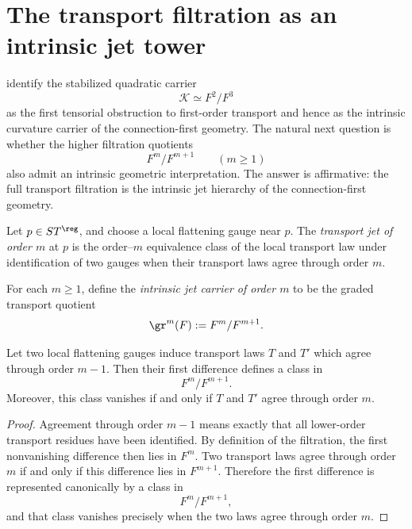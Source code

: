 \section{The transport filtration as an intrinsic jet tower}
\label{sec:jet-tower}
identify the stabilized quadratic carrier
\[
	\mathcal K \simeq F^2/F^3
\]
as the first tensorial obstruction to first-order transport and hence as
the intrinsic curvature carrier of the connection-first geometry.
The natural next question is whether the higher filtration quotients
\[
	F^m/F^{m+1}
	\qquad (m\ge 1)
\]
also admit an intrinsic geometric interpretation.
The answer is affirmative: the full transport filtration is the
intrinsic jet hierarchy of the connection-first geometry.
\begin{definition}
	Let \(p\in ST^{\reg}\), and choose a local flattening gauge near \(p\).
	The \emph{transport jet of order \(m\)} at \(p\) is the order--\(m\)
	equivalence class of the local transport law under identification of
	two gauges when their transport laws agree through order \(m\).
\end{definition}
\begin{definition}
	For each \(m\ge 1\), define the \emph{intrinsic jet carrier of order
		\(m\)} to be the graded transport quotient
	\[
		\gr^m(F):=F^m/F^{m+1}.
	\]
\end{definition}
\begin{lemma}
	\label{lem:order-filtration}
	Let two local flattening gauges induce transport laws \(T\) and \(T'\)
	which agree through order \(m-1\).  Then their first difference defines
	a class in
	\[
		F^m/F^{m+1}.
	\]
	Moreover, this class vanishes if and only if \(T\) and \(T'\) agree
	through order \(m\).
\end{lemma}
\begin{proof}
	Agreement through order \(m-1\) means exactly that all lower-order
	transport residues have been identified.  By definition of the
	filtration, the first nonvanishing difference then lies in \(F^m\).  Two
	transport laws agree through order \(m\) if and only if this difference
	lies in \(F^{m+1}\).  Therefore the first difference is represented
	canonically by a class in
	\[
		F^m/F^{m+1},
	\]
	and that class vanishes precisely when the two laws agree through order
	\(m\).
\end{proof}

